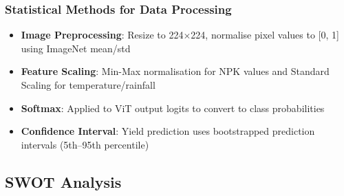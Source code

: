 \documentclass[12pt,a4paper]{article}
\begin{document}
\subsubsection{Statistical Methods for Data Processing}
\begin{itemize}
    \item \textbf{Image Preprocessing}: Resize to 224$\times$224, normalise pixel values to [0, 1] using ImageNet mean/std
    \item \textbf{Feature Scaling}: Min-Max normalisation for NPK values and Standard Scaling for temperature/rainfall
    \item \textbf{Softmax}: Applied to ViT output logits to convert to class probabilities
    \item \textbf{Confidence Interval}: Yield prediction uses bootstrapped prediction intervals (5th--95th percentile)
\end{itemize}

\subsection{SWOT Analysis}
\end{document}
